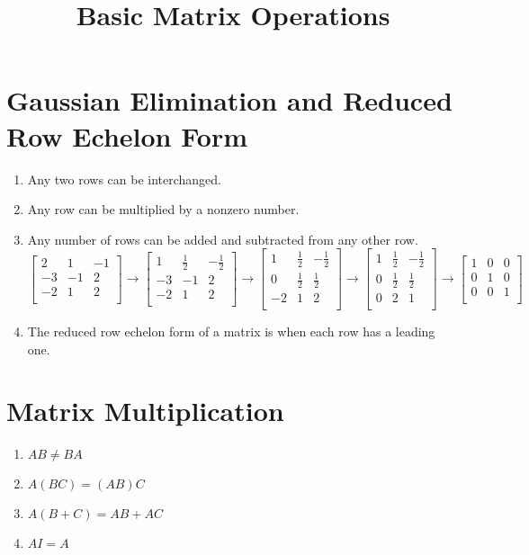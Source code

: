 \documentclass{article}
\title{Basic Matrix Operations}
\author{}
\date{}
\begin{document}
\maketitle

\section{Gaussian Elimination and Reduced Row Echelon Form}
\begin{enumerate}
\item Any two rows can be interchanged.
\item Any row can be multiplied by a nonzero number.
\item Any number of rows can be added and subtracted from any other row.
\[
\begin{bmatrix}
2 & 1 & -1 \\
-3 & -1 & 2 \\
-2 & 1 & 2 \\
\end{bmatrix}
\rightarrow
\begin{bmatrix}
1 & \frac{1}{2} & -\frac{1}{2} \\
-3 & -1 & 2 \\
-2 & 1 & 2 \\
\end{bmatrix}
\rightarrow
\begin{bmatrix}
1 & \frac{1}{2} & -\frac{1}{2} \\
0 & \frac{1}{2} & \frac{1}{2} \\
-2 & 1 & 2 \\
\end{bmatrix}
\rightarrow
\begin{bmatrix}
1 & \frac{1}{2} & -\frac{1}{2} \\
0 & \frac{1}{2} & \frac{1}{2} \\
0 & 2 & 1 \\
\end{bmatrix}
\rightarrow
\begin{bmatrix}
1 & 0 & 0 \\
0 & 1 & 0 \\
0 & 0 & 1 \\
\end{bmatrix}
\]
\item The reduced row echelon form of a matrix is when each row has a leading one.
\end{enumerate}

\section{Matrix Multiplication}
\begin{enumerate}
\item $AB \neq BA$
\item $A(BC) = (AB)C$
\item $A(B+C) = AB + AC$
\item $AI = A$

\end{enumerate}
\end{document}
